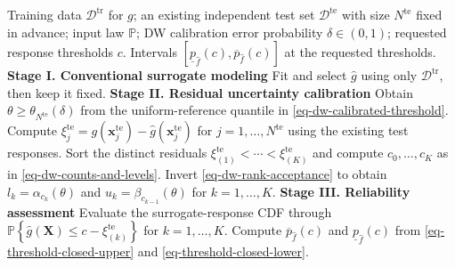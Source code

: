 \documentclass[review,11pt,3p,authoryear,nopreprintline]{elsarticle}
\begin{document}
\begin{algorithm}[H]
  \caption{Residual calibration and reliability assessment within a surrogate workflow}
  \label{alg-implementation}
  \small
  \begin{algorithmic}[1]
    \Require Training data $\mathcal D^{\mathrm{tr}}$ for $g$; an existing independent test set $\mathcal D^{\mathrm{te}}$ with size $N^{\mathrm{te}}$ fixed in advance; input law $\mathbb P$; DW calibration error probability $\delta\in(0,1)$; requested response thresholds $c$.
    \Ensure Intervals $\left[\underline p_{\hat f}(c),\overline p_{\hat f}(c)\right]$ at the requested thresholds.
    \Statex \textbf{Stage I. Conventional surrogate modeling}
    \State Fit and select $\hat g$ using only $\mathcal D^{\mathrm{tr}}$, then keep it fixed.
    \Statex \textbf{Stage II. Residual uncertainty calibration}
    \State Obtain $\theta\ge\theta_{N^{\mathrm{te}}}(\delta)$ from the uniform-reference quantile in \eqref{eq-dw-calibrated-threshold}.
    \State Compute $\xi_j^{\mathrm{te}}=g(\bm x_j^{\mathrm{te}})-\hat g(\bm x_j^{\mathrm{te}})$ for $j=1,\ldots,N^{\mathrm{te}}$ using the existing test responses.
    \State Sort the distinct residuals $\xi_{(1)}^{\mathrm{te}}<\cdots<\xi_{(K)}^{\mathrm{te}}$ and compute $c_0,\ldots,c_K$ as in \eqref{eq-dw-counts-and-levels}.
    \State Invert \eqref{eq-dw-rank-acceptance} to obtain $l_k=\alpha_{c_k}(\theta)$ and $u_k=\beta_{c_{k-1}}(\theta)$ for $k=1,\ldots,K$.
    \Statex \textbf{Stage III. Reliability assessment}
      \State Evaluate the surrogate-response CDF through $\mathbb P\left\{\hat g(\bm X)\le c-\xi_{(k)}^{\mathrm{te}}\right\}$ for $k=1,\ldots,K$.
      \State Compute $\overline p_{\hat f}(c)$ and $\underline p_{\hat f}(c)$ from \eqref{eq-threshold-closed-upper} and \eqref{eq-threshold-closed-lower}.
    \EndFor
  \end{algorithmic}
\end{algorithm}
\end{document}
